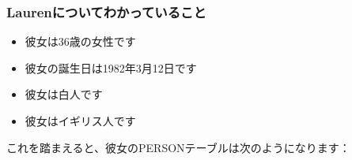 \documentclass[
  11pt]{book}
\providecommand{\tightlist}{%
  \setlength{\itemsep}{0pt}\setlength{\parskip}{0pt}}
\theoremstyle{definition}
\theoremstyle{definition}
\theoremstyle{definition}
\theoremstyle{definition}
\theoremstyle{remark}
\begin{document}
\subsubsection*{Laurenについてわかっていること}\label{laurenux306bux3064ux3044ux3066ux308fux304bux3063ux3066ux3044ux308bux3053ux3068}

\begin{itemize}
\tightlist
\item
  彼女は36歳の女性です
\item
  彼女の誕生日は1982年3月12日です
\item
  彼女は白人です
\item
  彼女はイギリス人です
\end{itemize}

これを踏まえると、彼女のPERSONテーブルは次のようになります：
\end{document}
